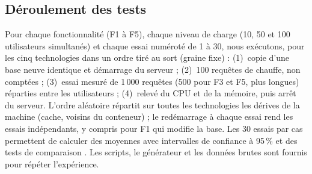 \subsection{Déroulement des tests}
Pour chaque fonctionnalité (F1 à F5), chaque niveau de charge (10, 50 et 100 utilisateurs simultanés) et chaque
essai numéroté de 1 à 30, nous exécutons, pour les cinq technologies dans un ordre tiré au sort (graine fixe) :
(1)~copie d'une base neuve identique et démarrage du serveur ; (2)~100 requêtes de chauffe, non comptées ;
(3)~essai mesuré de 1\,000 requêtes (500 pour F3 et F5, plus longues) réparties entre les utilisateurs ;
(4)~relevé du CPU et de la mémoire, puis arrêt du serveur. L'ordre aléatoire répartit sur toutes les technologies
les dérives de la machine (cache, voisins du conteneur) ; le redémarrage à chaque essai rend les essais
indépendants, y compris pour F1 qui modifie la base. Les 30 essais par cas permettent de calculer des moyennes
avec intervalles de confiance à 95\,\% et des tests de comparaison \cite{georges2007}.
Les scripts, le générateur et les données brutes sont fournis pour répéter l'expérience.
